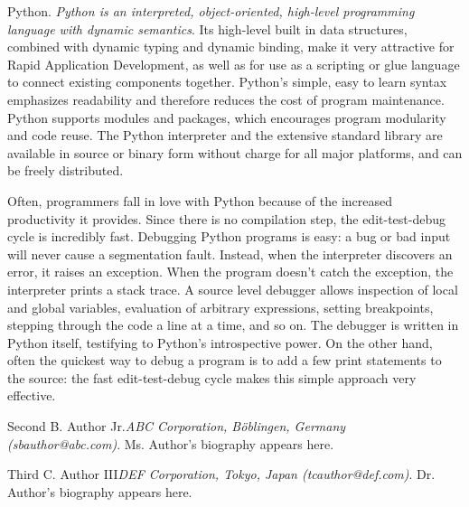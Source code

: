 \documentclass[]{IEEEibm}
\begin{document}
\begin{IEEEbiography}{Python.}\textit{ Python is an interpreted, object-oriented, high-level programming language with dynamic semantics}. Its high-level built in data structures, combined with dynamic typing and dynamic binding, make it very attractive for Rapid Application Development, as well as for use as a scripting or glue language to connect existing components together. Python's simple, easy to learn syntax emphasizes readability and therefore reduces the cost of program maintenance. Python supports modules and packages, which encourages program modularity and code reuse. The Python interpreter and the extensive standard library are available in source or binary form without charge for all major platforms, and can be freely distributed.

Often, programmers fall in love with Python because of the increased productivity it provides. Since there is no compilation step, the edit-test-debug cycle is incredibly fast. Debugging Python programs is easy: a bug or bad input will never cause a segmentation fault. Instead, when the interpreter discovers an error, it raises an exception. When the program doesn't catch the exception, the interpreter prints a stack trace. A source level debugger allows inspection of local and global variables, evaluation of arbitrary expressions, setting breakpoints, stepping through the code a line at a time, and so on. The debugger is written in Python itself, testifying to Python's introspective power. On the other hand, often the quickest way to debug a program is to add a few print statements to the source: the fast edit-test-debug cycle makes this simple approach very effective. 
 
\end{IEEEbiography}


\begin{IEEEbiography}{Second B. Author Jr.}\textit{ABC Corporation, Böblingen, Germany (sbauthor@abc.com)}. Ms. Author’s biography appears here.
\end{IEEEbiography}

\begin{IEEEbiography}{Third C. Author III}\textit{DEF Corporation, Tokyo, Japan (tcauthor@def.com)}. Dr. Author’s biography appears here.
\end{IEEEbiography}
\end{document}
